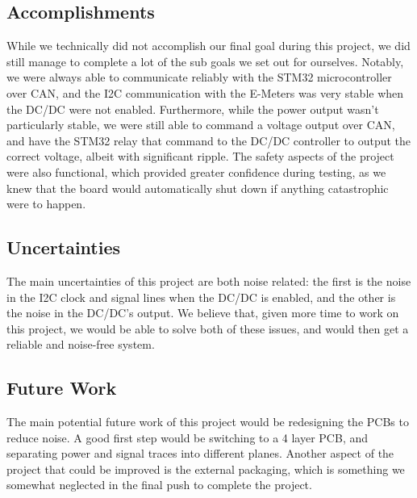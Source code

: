 \subsection{Accomplishments}
While we technically did not accomplish our final goal during this project, we did still manage to complete a lot of the sub goals we set out for ourselves.
Notably, we were always able to communicate reliably with the STM32 microcontroller over CAN, and the I2C communication with the E-Meters was very stable when the DC/DC were not enabled.
Furthermore, while the power output wasn't particularly stable, we were still able to command a voltage output over CAN, and have the STM32 relay that command to the DC/DC controller to output the correct voltage, albeit with significant ripple.
The safety aspects of the project were also functional, which provided greater confidence during testing, as we knew that the board would automatically shut down if anything catastrophic were to happen.

\subsection{Uncertainties}
The main uncertainties of this project are both noise related: the first is the noise in the I2C clock and signal lines when the DC/DC is enabled, and the other is the noise in the DC/DC's output.
We believe that, given more time to work on this project, we would be able to solve both of these issues, and would then get a reliable and noise-free system.

\subsection{Future Work}
The main potential future work of this project would be redesigning the PCBs to reduce noise. 
A good first step would be switching to a 4 layer PCB, and separating power and signal traces into different planes.
Another aspect of the project that could be improved is the external packaging, which is something we somewhat neglected in the final push to complete the project.